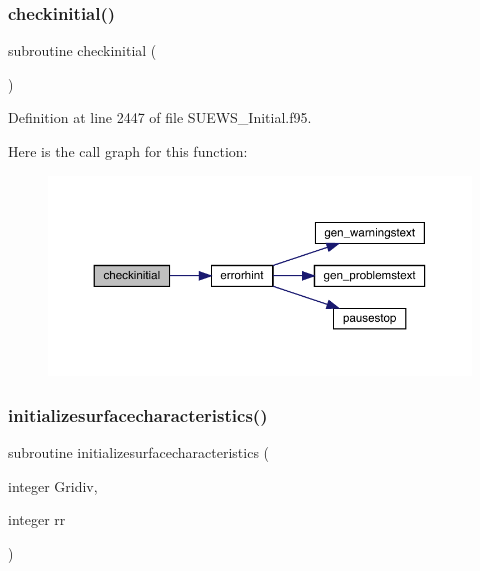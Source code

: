 \subsubsection{\texorpdfstring{checkinitial()}{checkinitial()}}
{\footnotesize\ttfamily subroutine checkinitial (\begin{DoxyParamCaption}{ }\end{DoxyParamCaption})}



Definition at line 2447 of file S\+U\+E\+W\+S\+\_\+\+Initial.\+f95.

Here is the call graph for this function\+:\nopagebreak
\begin{figure}[H]
\begin{center}
\leavevmode
\includegraphics[width=350pt]{_s_u_e_w_s___initial_8f95_a0e2e4356ea9fffb9d1ccaee3e377d2c9_cgraph}
\end{center}
\end{figure}
\mbox{\label{_s_u_e_w_s___initial_8f95_a60d2335c00fd453336ef8b8a74b907c7}} 
\subsubsection{\texorpdfstring{initializesurfacecharacteristics()}{initializesurfacecharacteristics()}}
{\footnotesize\ttfamily subroutine initializesurfacecharacteristics (\begin{DoxyParamCaption}\item[{integer}]{Gridiv,  }\item[{integer}]{rr }\end{DoxyParamCaption})}



